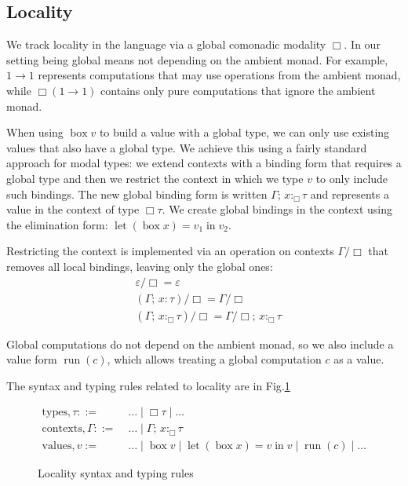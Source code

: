 \documentclass[acmsmall, screen, review, anonymous]{acmart}
\theoremstyle{definition}
\newcommand{\glob}{\mathop{\Box}}
\newcommand{\types}{\mathrel{:}}
\newcommand{\gtypes}{\mathrel{:_{\Box}}}
\newcommand{\cempty}{\varepsilon}
\newcommand{\ccons}[2]{#1;\,#2}
\newcommand{\lbind}[3]{\ccons{#1}{#2\types#3}}
\newcommand{\gbind}[3]{\ccons{#1}{#2\gtypes#3}}
\newcommand{\cdiv}[1]{#1/\Box}
\newcommand{\gbox}[1]{\mathop{\mathrm{box}} #1}
\newcommand{\gunbox}[3]{\mathop{\mathrm{let}} (\gbox #1) = #2 \mathop{\mathrm{in}} #3}
\newcommand{\grun}[1]{\mathop{\mathrm{run}}(#1)}
\newcommand{\turnv}{\mathrel{\vdash_V}}
\newcommand{\turnc}{\mathrel{\vdash_C}}
\begin{document}
\subsection{Locality}

We track locality in the language via a global comonadic modality
$\glob$. In our setting being global means not depending on the ambient
monad. For example, $1 \rightarrow 1$ represents computations that may
use operations from the ambient monad, while $\glob (1 \rightarrow 1)$
contains only pure computations that ignore the ambient monad.

When using $\gbox{v}$ to build a value with a global type, we can only
use existing values that also have a global type. We achieve this using
a fairly standard approach for modal types: we extend contexts with a
binding form that requires a global type and then we restrict the
context in which we type $v$ to only include such bindings. The new
global binding form is written $\gbind{\Gamma}{x}{\tau}$ and represents
a value in the context of type $\glob \tau$. We create global bindings
in the context using the elimination form: $\gunbox{x}{v_1}{v_2}$.

Restricting the context is implemented via an operation on contexts
$\cdiv{\Gamma}$ that removes all local bindings, leaving only the global
ones:
\begin{align*}
  &\cdiv{\cempty} = \cempty \\
  &\cdiv{(\lbind{\Gamma}{x}{\tau})} = \cdiv{\Gamma} \\
  &\cdiv{(\gbind{\Gamma}{x}{\tau})} = \gbind{\cdiv{\Gamma}}{x}{\tau}
\end{align*}

Global computations do not depend on the ambient monad, so we also
include a value form $\grun{c}$, which allows treating a global
computation $c$ as a value.

The syntax and typing rules related to locality are in
Fig.\ref{fig:typing-locality}
\begin{figure}
\begin{align*}
  \mathrm{types}, \tau ::=\;& \ldots \mid \glob \tau \mid \ldots \\
  \mathrm{contexts}, \Gamma ::=\;& \ldots \mid \gbind{\Gamma}{x}{\tau} \\
  \mathrm{values}, v :=\;& \ldots \mid \gbox{v} \mid \gunbox{x}{v}{v}
                           \mid \grun{c} \mid \ldots
\end{align*}
\caption{Locality syntax and typing rules}
\label{fig:typing-locality}
\end{figure}
\end{document}
